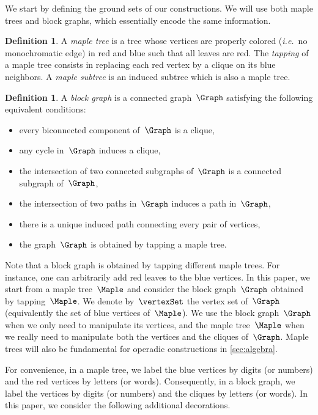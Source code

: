 \documentclass{amsart}
\theoremstyle{definition}
\newtheorem{definition}[theorem]{Definition}
\newcommand{\ie}{\textit{i.e.}~} %
\newcommand{\darkblue}{\color{darkblue}} %
\newcommand{\defn}[1]{\textsl{\darkblue #1}} %
\begin{document}
We start by defining the ground sets of our constructions.
We will use both maple trees and block graphs, which essentially encode the same information.

\begin{definition}
  A \defn{maple tree} is a tree whose vertices are properly colored (\ie no monochromatic edge) in red and blue such that all leaves are red.
  The \defn{tapping} of a maple tree consists in replacing each red vertex by a clique on its blue neighbors.
  A \defn{maple subtree} is an induced subtree which is also a maple tree.
\end{definition}

\begin{definition}
  \label{def:blockgraph}
  A \defn{block graph} is a connected graph~$\Graph$ satisfying the following equivalent conditions:
  \begin{itemize}
    \item every biconnected component of~$\Graph$ is a clique,
    \item any cycle in~$\Graph$ induces a clique,
    \item the intersection of two connected subgraphs of~$\Graph$ is a connected subgraph of~$\Graph$,
    \item the intersection of two paths in~$\Graph$ induces a path in~$\Graph$,
    \item there is a unique induced path connecting every pair of vertices,
    \item the graph~$\Graph$ is obtained by tapping a maple tree.
  \end{itemize}
\end{definition}

Note that a block graph is obtained by tapping different maple trees. For instance, one can arbitrarily add red leaves to the blue vertices.
In this paper, we start from a maple tree~$\Maple$ and consider the block graph~$\Graph$ obtained by tapping~$\Maple$.
We denote by~$\vertexSet$ the vertex set of~$\Graph$ (equivalently the set of blue vertices of~$\Maple$).
We use the block graph~$\Graph$ when we only need to manipulate its vertices, and the maple tree~$\Maple$ when we really need to manipulate both the vertices and the cliques of~$\Graph$.
Maple trees will also be fundamental for operadic constructions in \cref{sec:algebra}.

For convenience, in a maple tree, we label the blue vertices by digits (or numbers) and the red vertices by letters (or words).
Consequently, in a block graph, we label the vertices by digits (or numbers) and the cliques by letters (or words).
In this paper, we consider the following additional decorations.
\end{document}
